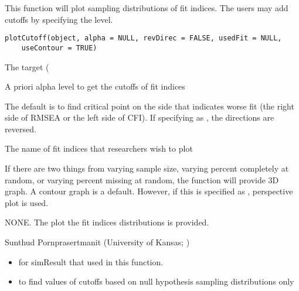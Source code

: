 \documentclass[a4paper]{book}
\begin{document}
%
\begin{Description}\relax
This function will plot sampling distributions of fit indices. The users may add cutoffs by specifying the  level.
\end{Description}
%
\begin{Usage}
\begin{verbatim}
plotCutoff(object, alpha = NULL, revDirec = FALSE, usedFit = NULL, 
	useContour = TRUE)
\end{verbatim}
\end{Usage}
%
\begin{Arguments}
\begin{ldescription}
\item[\code{object}] 
The target ( 

\item[\code{alpha}] 
A priori alpha level to get the cutoffs of fit indices

\item[\code{revDirec}] 
The default is to find critical point on the side that indicates worse fit (the right side of RMSEA or the left side of CFI). If specifying as , the directions are reversed.

\item[\code{usedFit}] 
The name of fit indices that researchers wish to plot

\item[\code{useContour}] 
If there are two things from varying sample size, varying percent completely at random, or varying percent missing at random, the  function will provide 3D graph. A contour graph is a default. However, if this is specified as , perspective plot is used.

\end{ldescription}
\end{Arguments}
%
\begin{Value}
NONE. The plot the fit indices distributions is provided.
\end{Value}
%
\begin{Author}\relax
Sunthud Pornprasertmanit (University of Kansas; )
\end{Author}
%
\begin{SeeAlso}\relax
\begin{itemize}

\item {} for simResult that used in this function.
\item {} to find values of cutoffs based on null hypothesis sampling distributions only

\end{itemize}

\end{SeeAlso}
\end{document}
